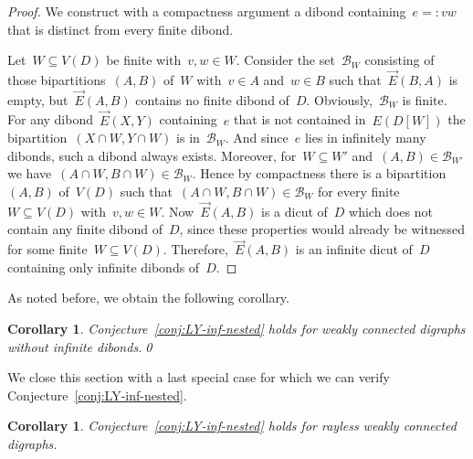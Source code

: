 \documentclass[reqno, 12pt]{amsart}
\numberwithin{equation}{section}
\numberwithin{figure}{section}
\theoremstyle{plain}
\newtheorem{corollary}[thm]{Corollary}
\theoremstyle{definition}
\begin{document}
\begin{proof}
   We construct with a compactness argument a dibond containing~${e =: vw}$ that is distinct from every finite dibond. 
   
   Let~${W \subseteq V(D)}$ be finite with~${v,w \in W}$. 
   Consider the set~$\mathcal{B}_W$ consisting of those bipartitions~${(A,B)}$ of~$W$ with~${v \in A}$ and~${w \in B}$ such that~${\overrightarrow{E}(B,A)}$ is empty, but~${\overrightarrow{E}(A,B)}$ contains no finite dibond of~$D$. 
   Obviously,~$\mathcal{B}_W$ is finite. 
   For any dibond~${\overrightarrow{E}(X,Y)}$ containing~$e$ that is not contained in~${E(D[W])}$ the bipartition~${(X \cap W, Y \cap W)}$ is in~$\mathcal{B}_W$. 
   And since~$e$ lies in infinitely many dibonds, such a dibond always exists. 
   Moreover, for~${W \subseteq W'}$ and~${(A,B) \in \mathcal{B}_{W'}}$ we have~${(A \cap W, B \cap W) \in \mathcal{B}_{W}}$. 
   Hence by compactness there is a bipartition~$(A,B)$ of~$V(D)$ such that~${(A \cap W, B \cap W) \in \mathcal{B}_W}$ for every finite~${W \subseteq V(D)}$ with~${v,w \in W}$. 
   Now~${\overrightarrow{E}(A,B)}$ is a dicut of~$D$ which does not contain any finite dibond of~$D$, since these properties would already be witnessed for some finite~${W \subseteq V(D)}$. 
   Therefore,~${\overrightarrow{E}(A,B)}$ is an infinite dicut of~$D$ containing only infinite dibonds of~$D$. 
\end{proof}



As noted before, we obtain the following corollary.

\begin{corollary}\label{cor:LY-no_inf-dibond}
    Conjecture~\ref{conj:LY-inf-nested} holds for weakly connected digraphs without infinite dibonds.\qed
\end{corollary}


We close this section with a last special case for which we can verify Conjecture~\ref{conj:LY-inf-nested}.

\begin{corollary}
    \label{cor:LY-rayless}
    Conjecture~\ref{conj:LY-inf-nested} holds for rayless weakly connected digraphs.
\end{corollary}
\end{document}
